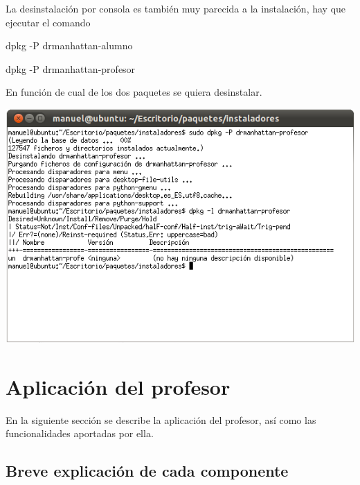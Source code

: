 \documentclass[a4paper,11pt]{article}
\begin{document}
La desinstalación por consola es también muy parecida a la instalación, hay que ejecutar el comando

\begin{center}
    dpkg -P drmanhattan-alumno

    dpkg -P drmanhattan-profesor
\end{center}

En función de cual de los dos paquetes se quiera desinstalar.

\begin{center}

    \includegraphics[width=.90\linewidth]{imagenes/desConsola}

\end{center}

\newpage
\section{Aplicación del profesor}

En la siguiente sección se describe la aplicación del profesor, así como las funcionalidades aportadas por ella.

\subsection{Breve explicación de cada componente}
\end{document}
